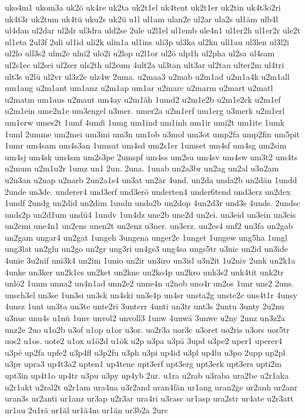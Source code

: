 {uko4m1
ukom3a
uk2ö
uk4re
uk2ta
uk2t1el
uk4tent
uk2t1er
uk2tin
uk4t3o2ri
uk4t3r
uk2tum
uk4tü
uku2s
uk2ü
u1l
ul1am
ulan2e
ul2ar
ula2s
ul1äm
ulb4l
ul4dan
ul2dar
ul2dr
ul3dra
uld2se
2ule
u2l1el
ul1emb
ule4n1
ul1er2h
ul1er2r
ule2t
ul1eta
2ul3f
2uli
ul1id
uli2k
ulin1a
ul1ins
uli3p
ul3ka
ul2kn
ull1au
ul3len
ul3l2i
ul2lo
ull3s2
ulm2e
ulni2
ulo2i
u2lop
u2l1or
ul2ö
ulp1h
ul2pha
ul2sa
ul4sam
ul2s1ec
ul2sei
ul2ser
uls2th
ul2sum
4ult2a
ul3tan
ult3ar
ul2tau
ulter2m
ul4tri
ult3s
u2lü
ul2vr
ul3z2e
ulz4w
2uma.
u2maa3
u2mab
u2m1ad
u2m1a4k
u2m1all
um1ang
u2m1ant
um1anz
u2m1ap
um1ar
u2marc
u2marm
u2mart
u2matl
u2matm
um1aus
u2maut
um4ay
u2m1äh
1umd2
u2m1e2b
u2m1e2ck
u2m1ef
u2m1ein
ume2n1e
um3engel
u3mer.
umer2a
u2m1erf
um1erg
u3merk
u2m1erl
um1erw
umes2t
1umf
4umfi
1umg
um1ind
um1inh
um1ir
umi2t
um1ite
1umk
1uml
2umme
um2mei
um3mi
um3n
um1ob
u3mol
um3ot
ump2fa
ump2fin
um5pit
1umr
um4sam
um4s3an
1umsat
um4sd
um2s1er
1umset
um4sf
um4sg
um2sim
um4sj
um4sk
um4sm
um2s3pe
2umspf
um4ss
um2su
um4sv
um4sw
um3t2
um4ts
u2mum
u2m1u2r
1umz
un1
2un.
2una.
1unab
un2a3br
un2ag
un2al
u3n2am
u2n3an
u2nap
u2narb
2un2a1s4
un3at
un2är
4und.
un2da
unda2b
un2dän
1undd
2unde
un3de.
underer4
und3erf
und3erö
underten4
under6tend
und3erz
un2dex
1undf
2undg
un2did
un2dim
1undn
undo2b
un2dop
4un2d3r
und3s
4unds.
2undsc
unds2p
un2d1um
undü4
1undv
1un4dz
une2b
une2d
un2ei.
un3eid
un3ein
un3eis
un2emi
une4n1
un2ens
unen2t
un2enz
u3ner.
un3erz.
un2es4
unf2
un3fa
un2gab
un2gam
ungar4
un2gat
1ungeh
3ungena
unger2e
1unget
1ungew
ung5ha
1ungl
ung3lat
un2glu
un2go
un2gr
ung3ri
un4gs3
ung4sa
ungs5tr
u3nic
un2id
un3ide
4unie
3u2nif
uni3k4
un2im
1unio
un2ir
un3iro
un3isl
u3n2it
1u2niv
2unk
un2k1a
4unke
un3ker
un2k1es
un2ket
un2kne
un2ko4p
un2kro
unk3s2
unk4tit
unk2tr
unlö2
1unm
unna2
un4n1ad
unn2e2
unne4n
u2nob
uno4r
un2os
1unr
uns2
2uns.
unsch3el
un3se
1un3si
un3sk
un4ski
un3s4p
un4sr
unsta2g
unste2c
uns4t1r
4unsy
4unsz
1unt
un3ta
un3te
unte2ri
3unterr
4unti
un3tr
unt3s
2untu
3unty
2u2nu
u3nuc
unu4s
u1nü
1unv
unvol2
unvoll3
1unw
4unwä
3unwe
u2ny
2unz
un3z2a
unz2e
2uo
u1o2b
u3of
u1op
u1or
u3or.
uo2r3a
uor3c
u3oret
uo2ris
u3ors
uor5tr
uos2
u1os.
uote2
u1ox
u1ö2d
u1ök
u2p
u3pa
u3pä
3upd
u3pe2
uper1
uperer4
u3pé
up2fa
upfe2
u3p4fl
u3p2fu
u3ph
u3pi
up4id
u3pl
up4lu
u3po
2upp
up2pl
u3pr
upra3
up4t3a2
upten1
up4tene
upt3erf
upt3erg
upt3erk
upt3ers
upti2m
upt3in
up4t1o
up4tr
u3pu
u3py
up4yb
2ur.
u1ra
u2rab
u3raba
ura2be
u2r1aka
u2r1akt
u2ral2t
u2r1am
ura4na
u3r2and
uran4fän
ur1ang
uran2ge
ur2anh
ur2anr
uran3s
ur2anti
ur1anz
ur3ap
u2r3ar
ura4ri
u3rasc
ur1asp
ura2str
ur4ate
u2r3att
ur1au
2u1rä
ur1äl
ur1ä4m
ur1än
ur3b2a
2urc
}
